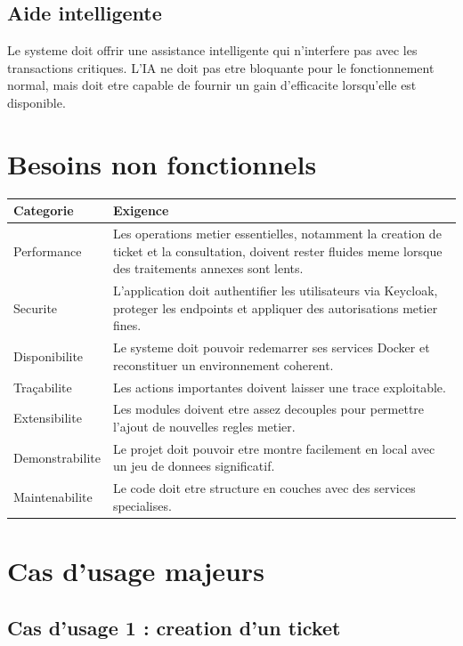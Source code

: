 \documentclass[12pt,a4paper,oneside]{report}
\begin{document}
\subsection{Aide intelligente}

Le systeme doit offrir une assistance intelligente qui n'interfere pas avec les transactions critiques. L'IA ne doit pas etre bloquante pour le fonctionnement normal, mais doit etre capable de fournir un gain d'efficacite lorsqu'elle est disponible.

\section{Besoins non fonctionnels}

\begin{longtable}{>{\raggedright\arraybackslash}p{3cm} >{\raggedright\arraybackslash}p{10.5cm}}
\toprule
Categorie & Exigence \\
\midrule
Performance & Les operations metier essentielles, notamment la creation de ticket et la consultation, doivent rester fluides meme lorsque des traitements annexes sont lents. \\
Securite & L'application doit authentifier les utilisateurs via Keycloak, proteger les endpoints et appliquer des autorisations metier fines. \\
Disponibilite & Le systeme doit pouvoir redemarrer ses services Docker et reconstituer un environnement coherent. \\
Traçabilite & Les actions importantes doivent laisser une trace exploitable. \\
Extensibilite & Les modules doivent etre assez decouples pour permettre l'ajout de nouvelles regles metier. \\
Demonstrabilite & Le projet doit pouvoir etre montre facilement en local avec un jeu de donnees significatif. \\
Maintenabilite & Le code doit etre structure en couches avec des services specialises. \\
\bottomrule
\end{longtable}

\section{Cas d'usage majeurs}

\subsection{Cas d'usage 1 : creation d'un ticket}
\end{document}
